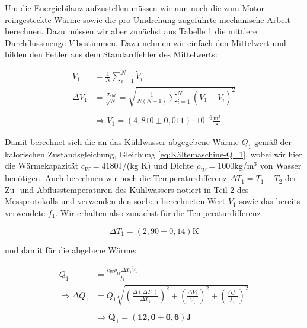 \documentclass{article}
\begin{document}
Um die Energiebilanz aufzustellen müssen wir nun noch die zum Motor reingesteckte Wärme sowie die pro Umdrehung zugeführte mechanische Arbeit berechnen. Dazu müssen wir aber zunächst aus Tabelle 1 die mittlere Durchflussmenge $\dot{V}$ bestimmen. Dazu nehmen wir einfach den Mittelwert und bilden den Fehler aus dem Standardfehler des Mittelwerts:

\begin{equation}
    \begin{split}
        \dot{V}_1 &= \frac{1}{N} \sum_{i=1}^N \dot{V}_i \\
        \Delta \dot{V}_1 &= \frac{\sigma_{std}}{\sqrt{N}} = \sqrt{\frac{1}{N(N-1)} \sum_{i=1}^N ( \dot{V}_1 - \dot{V}_i)^2} \\ \\
        &\Rightarrow \dot{V}_1 = (4,810 \pm 0,011) \cdot 10^{-6} \frac{\text{m}^3}{\text{s}}
    \end{split}
\end{equation}

Damit berechnet sich die an das Kühlwasser abgegebene Wärme $Q_1$ gemäß der kalorischen Zustandsgleichung, Gleichung \ref{eq:Kältemaschine-Q_1}, wobei wir hier die Wärmekapazität $c_W = 4180$J/(kg K) und Dichte $\rho_W = 1000$kg/m$^3$ von Wasser benötigen. Auch berechnen wir noch die Temperaturdifferenz $\Delta T_1 = T_1 - T_2$ der Zu- und Abflusstemperaturen des Kühlwassers notiert in Teil 2 des Messprotokolls und verwenden den soeben berechneten Wert $\dot{V}_1$ sowie das bereits verwendete $f_1$. Wir erhalten also zunächst für die Temperaturdifferenz

\begin{equation}
    \Delta T_1 = (2,90 \pm 0,14) \text{K}
\end{equation}

und damit für die abgebene Wärme:

\begin{equation}
    \begin{split}
        Q_1 &= \frac{c_W \rho_W \Delta T_1 \dot{V}_1}{f_1} \\
        \Rightarrow \Delta Q_1 &= Q_1 \sqrt{\left( \frac{\Delta (\Delta T_1)}{\Delta T_1} \right)^2 + \left( \frac{\Delta \dot{V}_1}{\dot{V}_1} \right)^2 + \left( \frac{\Delta f_1}{f_1} \right)^2} \\ \\
        &\Rightarrow \bm{Q_1} = \bm{(12,0 \pm 0,6)} \textbf{J}
    \end{split}
    \label{eq:3.1-Q_1}
\end{equation}
\end{document}
